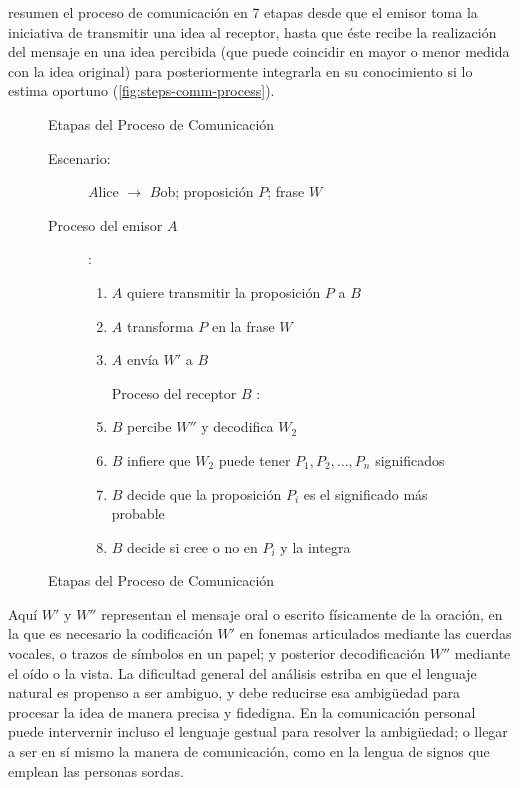 \citet{Russell2003} resumen el proceso de comunicación en 7 etapas desde que el emisor toma la iniciativa de transmitir una idea al receptor, hasta que éste recibe la realización del mensaje en una idea percibida (que puede coincidir en mayor o menor medida con la idea original) para posteriormente integrarla en su conocimiento si lo estima oportuno (\autoref{fig:steps-comm-process}).

\begin{figure}[htbp]
\centering
\begin{framed}
\begin{minipage}{\textwidth}
\begin{center}
{\large \textsf{Etapas del Proceso de Comunicación}}
\end{center}
\begin{description}
\item[Escenario:] $A$lice $\longrightarrow$ $B$ob; proposición $P$; frase $W$
\item[Proceso del emisor $A$]:
\begin{enumerate}
\item {} $A$ quiere transmitir la proposición $P$ a $B$
\item {} $A$ transforma $P$ en la frase $W$
\item {} $A$ envía $W'$ a $B$
\item[Proceso del receptor $B$]:
\item {} $B$ percibe $W''$ y decodifica $W_2$
\item {} $B$ infiere que $W_2$ puede tener $P_1, P_2, \ldots, P_n$ significados
\item {} $B$ decide que la proposición $P_i$ es el significado más probable
\item {} $B$ decide si cree o no en $P_i$ y la integra
\end{enumerate}
\end{description}
\end{minipage}
\end{framed}
\caption[Etapas del Proceso de Comunicación]{Etapas del Proceso de Comunicación \citep[pp. 792]{Russell2003}}
\label{fig:steps-comm-process}
\end{figure}

Aquí $W'$ y $W''$ representan el mensaje oral o escrito físicamente de la oración, en la que es necesario la codificación $W'$ en fonemas articulados mediante las cuerdas vocales, o trazos de símbolos en un papel; y posterior decodificación $W''$ mediante el oído o la vista. La dificultad general del análisis estriba en que el lenguaje natural es propenso a ser ambiguo, y debe reducirse esa ambigüedad para procesar la idea de manera precisa y fidedigna. En la comunicación personal puede intervernir incluso el lenguaje gestual para resolver la ambigüedad; o llegar a ser en sí mismo la manera de comunicación, como en la lengua de signos que emplean las personas sordas.

